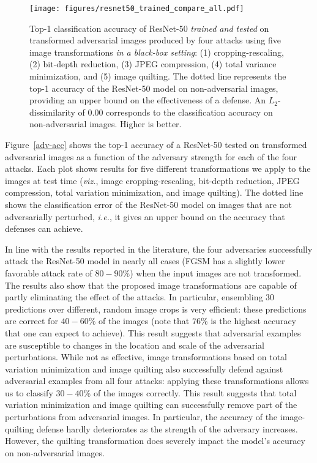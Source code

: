\begin{figure*}[t!]
    \centering
    \texttt{[image: figures/resnet50\_trained\_compare\_all.pdf]}
    \caption{Top-1 classification accuracy of ResNet-50 \emph{trained and tested} on transformed adversarial images produced by four attacks using five image transformations \emph{in a black-box setting}: (1) cropping-rescaling, (2) bit-depth reduction, (3) JPEG compression, (4) total variance minimization, and (5) image quilting. The dotted line represents the top-1 accuracy of the ResNet-50 model on non-adversarial images, providing an upper bound on the effectiveness of a defense. An $L_2$-dissimilarity of $0.00$ corresponds to the classification accuracy on non-adversarial images. Higher is better.}\label{adv-acc-trained}
\end{figure*}

Figure~\ref{adv-acc} shows the top-1 accuracy of a ResNet-50 tested on transformed adversarial images as a function of the adversary strength for each of the four attacks. Each plot shows results for five different transformations we apply to the images at test time (\emph{viz.}, image cropping-rescaling, bit-depth reduction, JPEG compression, total variation minimization, and image quilting). The dotted line shows the classification error of the ResNet-50 model on images that are not adversarially perturbed, \emph{i.e.}, it gives an upper bound on the accuracy that defenses can achieve.

In line with the results reported in the literature, the four adversaries successfully attack the ResNet-50 model in nearly all cases (FGSM has a slightly lower favorable attack rate of $80 \!-\! 90$\%) when the input images are not transformed. The results also show that the proposed image transformations are capable of partly eliminating the effect of the attacks. In particular, ensembling $30$ predictions over different, random image crops is very efficient: these predictions are correct for $40 \!-\! 60$\% of the images (note that $76$\% is the highest accuracy that one can expect to achieve). This result suggests that adversarial examples are susceptible to changes in the location and scale of the adversarial perturbations. While not as effective, image transformations based on total variation minimization and image quilting also successfully defend against adversarial examples from all four attacks: applying these transformations allows us to classify $30 \!-\! 40$\% of the images correctly. This result suggests that total variation minimization and image quilting can successfully remove part of the perturbations from adversarial images. In particular, the accuracy of the image-quilting defense hardly deteriorates as the strength of the adversary increases. However, the quilting transformation does severely impact the model's accuracy on non-adversarial images.

